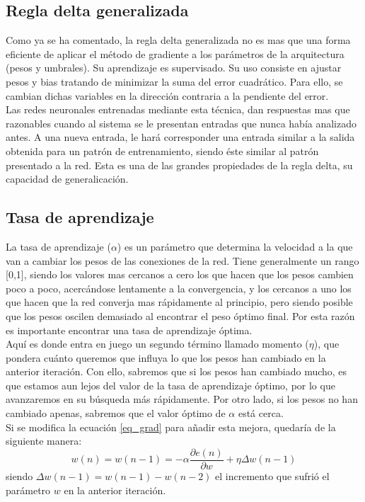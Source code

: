 \subsection{Regla delta generalizada}
Como ya se ha comentado, la regla delta generalizada no es mas que una forma eficiente de aplicar el método de gradiente a los parámetros de la arquitectura (pesos y umbrales). Su aprendizaje es supervisado. Su uso consiste en ajustar pesos y bias tratando de minimizar la suma del error cuadrático. Para ello, se cambian dichas variables en la dirección contraria a la pendiente del error.\\
Las redes neuronales entrenadas mediante esta técnica, dan respuestas mas que razonables cuando al sistema se le presentan entradas que nunca había analizado antes. A una nueva entrada, le hará corresponder una entrada similar a la salida obtenida para un patrón de entrenamiento, siendo éste similar al patrón presentado a la red. Esta es una de las grandes propiedades de la regla delta, su capacidad de generalicación.\\
\subsection{Tasa de aprendizaje}
La tasa de aprendizaje (${\alpha}$) es un parámetro que determina la velocidad a la que van a cambiar los pesos de las conexiones de la red. Tiene generalmente un rango [0,1], siendo los valores mas cercanos a cero los que hacen que los pesos cambien poco a poco, acercándose lentamente a la convergencia, y los cercanos a uno los que hacen que la red converja mas rápidamente al principio, pero siendo posible que los pesos oscilen demasiado al encontrar el peso óptimo final. Por esta razón es importante encontrar una tasa de aprendizaje óptima.\\
Aquí es donde entra en juego un segundo término llamado momento (${\eta}$), que pondera cuánto queremos que influya lo que los pesos han cambiado en la anterior iteración. Con ello, sabremos que si los pesos han cambiado mucho, es que estamos aun lejos del valor de la tasa de aprendizaje óptimo, por lo que avanzaremos en su búsqueda más rápidamente. Por otro lado, si los pesos no han cambiado apenas, sabremos que el valor óptimo de ${\alpha}$ está cerca.\\
Si se modifica la ecuación \ref{eq_grad} para añadir esta mejora, quedaría de la siguiente manera:
\begin{equation}
w(n) = w(n-1) = - \alpha \frac{\partial e(n)}{\partial w} + \eta \Delta w(n-1)
\end{equation}
siendo ${\Delta w(n-1)=w(n-1)-w(n-2)}$ el incremento que sufrió el parámetro ${w}$ en la anterior iteración.
